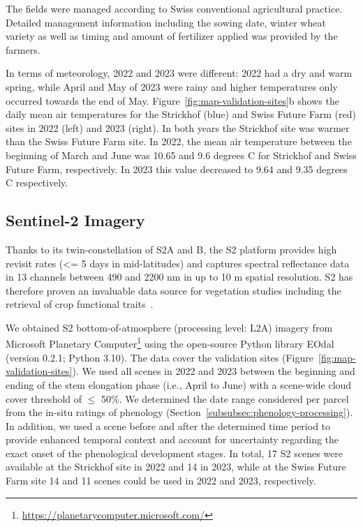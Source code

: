 The fields were managed according to Swiss conventional agricultural practice. Detailed management information including the sowing date, winter wheat variety as well as timing and amount of fertilizer applied was provided by the farmers.

In terms of meteorology, 2022 and 2023 were different: 2022 had a dry and warm spring, while April and May of 2023 were rainy and higher temperatures only occurred towards the end of May. Figure~\ref{fig:map-validation-sites}b shows the daily mean air temperatures for the Strickhof (blue) and Swiss Future Farm (red) sites in 2022 (left) and 2023 (right). In both years the Strickhof site was warmer than the Swiss Future Farm site. In 2022, the mean air temperature between the beginning of March and June was 10.65 and 9.6 degrees C for Strickhof and Swiss Future Farm, respectively. In 2023 this value decreased to 9.64 and 9.35 degrees C respectively.

\subsection{Sentinel-2 Imagery}
\label{subsec:s2-imagery}
Thanks to its twin-constellation of \gls{S2}A and B, the \gls{S2} platform provides high revisit rates (<= 5 days in mid-latitudes) and captures spectral reflectance data in 13 channels between 490 and 2200 nm in up to 10 m spatial resolution. \gls{S2} has therefore proven an invaluable data source for vegetation studies including the retrieval of crop functional traits~\citep[for instance]{amin_prototyping_2021,delloye_retrieval_2018}.

We obtained \gls{S2} bottom-of-atmosphere (processing level: L2A) imagery from Microsoft Planetary Computer\footnote{\url{https://planetarycomputer.microsoft.com/}} using the open-source Python library EOdal~\citep{graf_eodal_2022} (version 0.2.1; Python 3.10). The data cover the validation sites (Figure~\ref{fig:map-validation-sites}). We used all scenes in 2022 and 2023 between the beginning and ending of the stem elongation phase (i.e., April to June) with a scene-wide cloud cover threshold of $\le$ 50\%. We determined the date range considered per parcel from the in-situ ratings of phenology (Section~\ref{subsubsec:phenology-processing}). In addition, we used a scene before and after the determined time period to provide enhanced temporal context and account for uncertainty regarding the exact onset of the phenological development stages. In total, 17 \gls{S2} scenes were available at the Strickhof site in 2022 and 14 in 2023, while at the Swiss Future Farm site 14 and 11 scenes could be used in 2022 and 2023, respectively.
